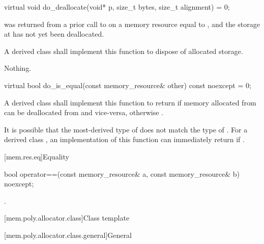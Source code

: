 %
\begin{itemdecl}
virtual void do_deallocate(void* p, size_t bytes, size_t alignment) = 0;
\end{itemdecl}

\begin{itemdescr}
\pnum
\expects
{} was returned from a prior call to 
on a memory resource equal to ,
and the storage at  has not yet been deallocated.

\pnum
\effects
A derived class shall implement this function to dispose of allocated storage.

\pnum
\throws
Nothing.
\end{itemdescr}

%
\begin{itemdecl}
virtual bool do_is_equal(const memory_resource& other) const noexcept = 0;
\end{itemdecl}

\begin{itemdescr}
\pnum
\returns
A derived class shall implement this function to return  if memory allocated from  can be deallocated from  and vice-versa,
otherwise .
\begin{note}
It is possible that the most-derived type of  does not match the type of .
For a derived class , an implementation of this function
can immediately return 
if .
\end{note}
\end{itemdescr}

[mem.res.eq]{Equality}

%
\begin{itemdecl}
bool operator==(const memory_resource& a, const memory_resource& b) noexcept;
\end{itemdecl}

\begin{itemdescr}
\pnum
\returns
{}.
\end{itemdescr}

[mem.poly.allocator.class]{Class template }

[mem.poly.allocator.class.general]{General}

